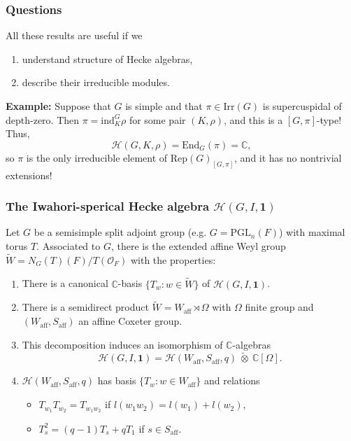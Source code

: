 \documentclass{beamer}
\newcommand{\Rep}{\mathrm{Rep}}
\newcommand{\Irr}{\mathrm{Irr}}
\newcommand{\PGL}{\mathrm{PGL}}
\newcommand{\End}{\mathrm{End}}
\newcommand{\ind}{\mathrm{ind}}
\newcommand{\aff}{\mathrm{aff}}
\newcommand{\CC}{\mathbb{C}}
\newcommand{\cH}{\mathcal{H}}
\theoremstyle{plain}
\begin{document}
\begin{frame}
    \frametitle{Questions}
    All these results are useful if we \pause
    \begin{enumerate}
        \item understand structure of Hecke algebras, \pause
        \item describe their irreducible modules. \pause
    \end{enumerate}
    \vspace{0.5cm}
    \textbf{Example:} Suppose that $G$ is simple and that $\pi\in\Irr(G)$ is supercuspidal of depth-zero. \pause
    Then $\pi=\ind_K^G\rho$ for some pair $(K,\rho)$, and this is a $[G,\pi]$-type! \pause
    Thus,
    \[\cH(G,K,\rho)=\End_G(\pi)=\CC,\]\pause
    so $\pi$ is the only irreducible element of $\Rep(G)_{[G,\pi]}$, and it has no nontrivial extensions!
\end{frame}


\begin{frame}
    \frametitle{The Iwahori-sperical Hecke algebra $\cH(G,I,\mathbf{1})$}
    Let $G$ be a semisimple split adjoint group (e.g. $G=\PGL_n(F)$) with maximal torus $T$. \pause
    Associated to $G$, there is the extended affine Weyl group $\widetilde{W}=N_G(T)(F)/T(\mathcal{O}_F)$ with the properties:\pause
    \begin{enumerate}
        \item There is a canonical $\CC$-basis $\{T_w:w\in\widetilde{W}\}$ of $\cH(G,I,\mathbf{1})$.\pause
        \item There is a semidirect product $\widetilde{W}=W_{\aff}\rtimes\Omega$ with $\Omega$ finite group and $(W_{\aff},S_{\aff})$ an affine Coxeter group. \pause
        \item This decomposition induces an isomorphism of $\CC$-algebras
        \[\cH(G,I,\mathbf{1})=\cH(W_{\aff},S_{\aff},q)\ \tilde{\otimes}\ \CC[\Omega].\] \pause
        \item $\cH(W_{\aff},S_{\aff},q)$ has basis $\{T_w:w\in W_{\aff}\}$ and relations
        \begin{itemize}
            \item $T_{w_1}T_{w_2}=T_{w_1w_2}$ if $l(w_1w_2)=l(w_1)+l(w_2)$,
            \item $T_s^2=(q-1)T_s+qT_1$ if $s\in S_{\aff}$.
        \end{itemize}
    \end{enumerate}
\end{frame}
\end{document}
